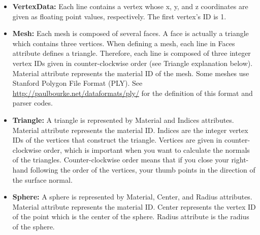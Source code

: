\documentclass[12pt]{article}
\begin{document}
\begin{itemize}
\item \textbf{VertexData:} Each  line  contains  a  vertex  whose  x,
y, and  z  coordinates  are  given as floating point values,
respectively. The first vertex's ID is 1.

\item \textbf{Mesh:} Each mesh is composed of several faces. A face is
actually a triangle which contains three vertices. When defining a mesh,
each line in Faces attribute defines a triangle. Therefore,
each line is composed of three integer vertex IDs given in
counter-clockwise order (see Triangle explanation below).
Material attribute represents the material ID of the mesh. Some meshes
use Stanford Polygon File Format (PLY). See
\url{http://paulbourke.net/dataformats/ply/} for the definition of this
format and parser codes.

\item \textbf{Triangle:} A  triangle is  represented  by Material and
Indices attributes. Material attribute represents  the material ID.
Indices are the integer vertex IDs  of  the vertices that construct  the
triangle. Vertices are given in counter-clockwise order, which is
important when you want to  calculate  the  normals  of  the  triangles.
Counter-clockwise order means that if you close your right-hand
following the order of the vertices, your thumb points in the direction
of the surface normal.

\item \textbf{Sphere:} A  sphere  is  represented  by  Material,
Center, and  Radius  attributes.  Material attribute represents the
material ID. Center represents the vertex ID of the point which is
the center of the sphere. Radius attribute is the radius of the
sphere.

\end{itemize}
\end{document}
